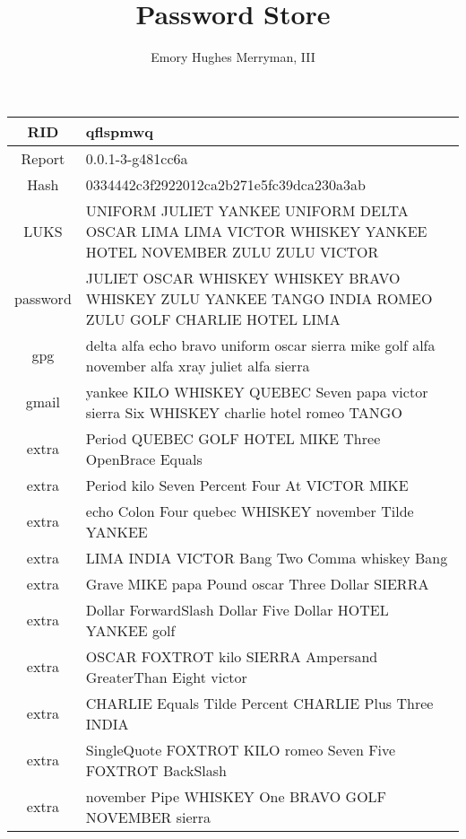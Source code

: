 \documentclass{article}
\begin{document}
\title{Password Store}
\author{Emory Hughes Merryman, III}
\maketitle
\begin{tabular}{||c|p{10cm}||}
  \hline
  RID & qflspmwq \\ \hline
  Report & 0.0.1-3-g481cc6a \\ \hline
  Hash & 0334442c3f2922012ca2b271e5fc39dca230a3ab \\ \hline
  LUKS & UNIFORM JULIET YANKEE UNIFORM DELTA OSCAR LIMA LIMA VICTOR WHISKEY YANKEE HOTEL NOVEMBER ZULU ZULU VICTOR \\ \hline
  password & JULIET OSCAR WHISKEY WHISKEY BRAVO WHISKEY ZULU YANKEE TANGO INDIA ROMEO ZULU GOLF CHARLIE HOTEL LIMA \\ \hline
  gpg & delta alfa echo bravo uniform oscar sierra mike golf alfa november alfa xray juliet alfa sierra \\ \hline
  gmail & yankee KILO WHISKEY QUEBEC Seven papa victor sierra Six WHISKEY charlie hotel romeo TANGO \\ \hline
  extra & Period QUEBEC GOLF HOTEL MIKE Three OpenBrace Equals \\ \hline
  extra & Period kilo Seven Percent Four At VICTOR MIKE \\ \hline
  extra & echo Colon Four quebec WHISKEY november Tilde YANKEE \\ \hline
  extra & LIMA INDIA VICTOR Bang Two Comma whiskey Bang \\ \hline
  extra & Grave MIKE papa Pound oscar Three Dollar SIERRA \\ \hline
  extra & Dollar ForwardSlash Dollar Five Dollar HOTEL YANKEE golf \\ \hline
  extra & OSCAR FOXTROT kilo SIERRA Ampersand GreaterThan Eight victor \\ \hline
  extra & CHARLIE Equals Tilde Percent CHARLIE Plus Three INDIA \\ \hline
  extra & SingleQuote FOXTROT KILO romeo Seven Five FOXTROT BackSlash \\ \hline
  extra & november Pipe WHISKEY One BRAVO GOLF NOVEMBER sierra \\ \hline
  \hline
\end{tabular}
\end{document}
